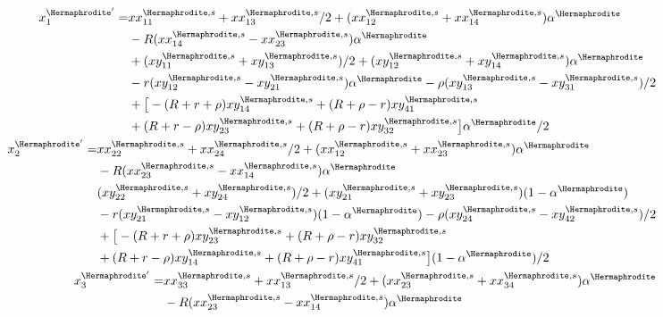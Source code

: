 \documentclass[12pt]{article}
\begin{document}
\begingroup
\allowdisplaybreaks
\begin{subequations}
\begin{align}
%
\begin{split}
x_{1}^{{\Hermaphrodite}'}=&xx_{11}^{\Hermaphrodite,s}+xx_{13}^{\Hermaphrodite,s}/2+(xx_{12}^{\Hermaphrodite,s}+xx_{14}^{\Hermaphrodite,s})\alpha^\Hermaphrodite\\
&-R(xx_{14}^{\Hermaphrodite,s}-xx_{23}^{\Hermaphrodite,s}) \alpha^\Hermaphrodite\\
&+(xy_{11}^{\Hermaphrodite,s}+xy_{13}^{\Hermaphrodite,s})/2+(xy_{12}^{\Hermaphrodite,s}+xy_{14}^{\Hermaphrodite,s})\alpha^\Hermaphrodite\\
&- r(xy_{12}^{\Hermaphrodite,s}-xy_{21}^{\Hermaphrodite,s})\alpha^\Hermaphrodite - \rho(xy_{13}^{\Hermaphrodite,s}-xy_{31}^{\Hermaphrodite,s})/2\\
&+\big{[}-(R+r+\rho)xy_{14}^{\Hermaphrodite,s} +(R+\rho-r)xy_{41}^{\Hermaphrodite,s}\\
&+(R+r-\rho) xy_{23}^{\Hermaphrodite,s}+(R+\rho-r)xy_{32}^{\Hermaphrodite,s}\big{]}\alpha^\Hermaphrodite/2
\end{split}
\\
%
\begin{split}
x_{2}^{{\Hermaphrodite}'}=&xx_{22}^{\Hermaphrodite,s}+xx_{24}^{\Hermaphrodite,s}/2+(xx_{12}^{\Hermaphrodite,s}+xx_{23}^{\Hermaphrodite,s})\alpha^\Hermaphrodite\\
&-R(xx_{23}^{\Hermaphrodite,s}-xx_{14}^{\Hermaphrodite,s}) \alpha^\Hermaphrodite\\
&(xy_{22}^{\Hermaphrodite,s}+xy_{24}^{\Hermaphrodite,s})/2+(xy_{21}^{\Hermaphrodite,s}+xy_{23}^{\Hermaphrodite,s})(1-\alpha^\Hermaphrodite)\\
&- r(xy_{21}^{\Hermaphrodite,s}-xy_{12}^{\Hermaphrodite,s})(1-\alpha^\Hermaphrodite) - \rho(xy_{24}^{\Hermaphrodite,s}-xy_{42}^{\Hermaphrodite,s})/2\\
&+\big{[}-(R+r+\rho)xy_{23}^{\Hermaphrodite,s}+(R+\rho-r)xy_{32}^{\Hermaphrodite,s}\\
&+(R+r-\rho) xy_{14}^{\Hermaphrodite,s}+(R+\rho-r)xy_{41}^{\Hermaphrodite,s}\big{]}(1-\alpha^\Hermaphrodite)/2
\end{split}
\\
%
\begin{split}
x_{3}^{{\Hermaphrodite}'}=&xx_{33}^{\Hermaphrodite,s}+xx_{13}^{\Hermaphrodite,s}/2+(xx_{23}^{\Hermaphrodite,s}+xx_{34}^{\Hermaphrodite,s})\alpha^\Hermaphrodite\\
&-R(xx_{23}^{\Hermaphrodite,s}-xx_{14}^{\Hermaphrodite,s}) \alpha^\Hermaphrodite\\

\end{split}
\end{align}
\end{subequations}
\end{document}
